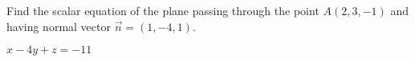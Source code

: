 
\begin{Exercise}[
name={},
title={}, 
difficulty=0,
origin={\cite{SM}}]
Find the scalar equation of the plane passing through the point $A(2,3,-1)$ and having normal vector $\vec{n}=(1,-4,1)$.
\end{Exercise}

\begin{Answer}
$x-4y+z=-11$
\end{Answer}
